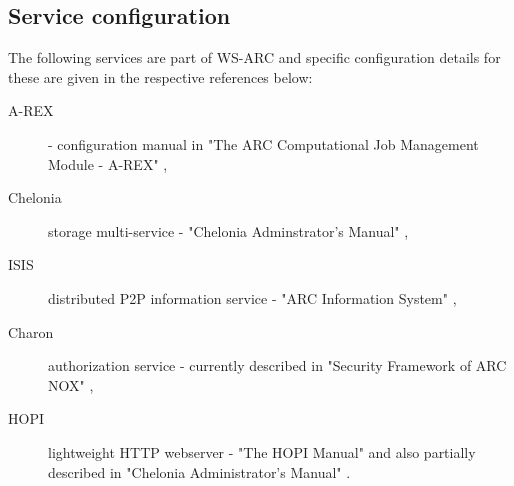 \documentclass{article}
\begin{document}
\subsection{Service configuration}\label{sec:Service configuration}
The following services are part of WS-ARC and specific configuration details for
these are given in the respective references below:
\begin{description}
\item[A-REX] - configuration manual in "The ARC Computational Job Management
Module - A-REX" \cite{a-rex},
\item[Chelonia] storage multi-service - "Chelonia Adminstrator's Manual"
\cite{storage-manual},
\item[ISIS] distributed P2P information service - "ARC Information System"
\cite{isis},
\item[Charon] authorization service - currently described in "Security
Framework of ARC NOX" \cite{arc1-security},
\item[HOPI] lightweight HTTP webserver - "The HOPI Manual" \cite{hopi}
and also partially described in "Chelonia Administrator's Manual"
\cite{storage-manual}.
\end{description}
\end{document}
